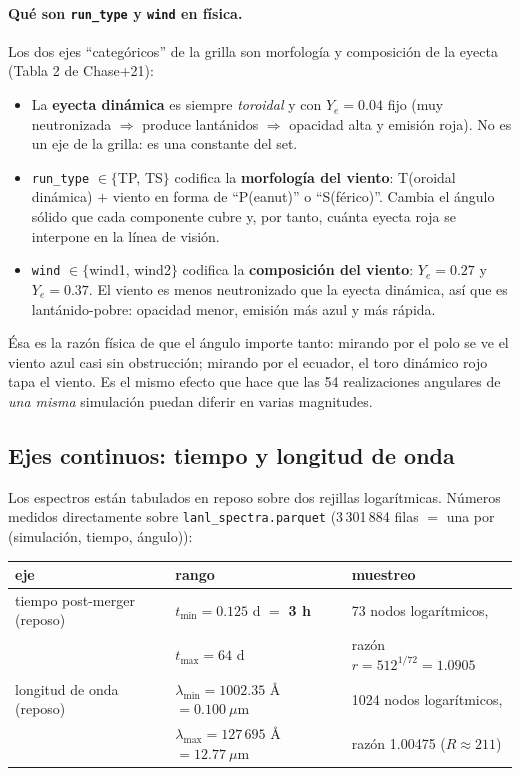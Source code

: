 \documentclass[11pt,a4paper]{article}
\newcommand{\code}[1]{\texttt{\small #1}}
\begin{document}
\paragraph{Qué son \code{run\_type} y \code{wind} en física.} Los dos ejes ``categóricos'' de la
grilla son morfología y composición de la eyecta (Tabla 2 de Chase+21):
\begin{itemize}[nosep]
  \item La \textbf{eyecta dinámica} es siempre \emph{toroidal} y con $Y_e = 0.04$ fijo (muy
        neutronizada $\Rightarrow$ produce lantánidos $\Rightarrow$ opacidad alta y emisión roja).
        No es un eje de la grilla: es una constante del set.
  \item \code{run\_type} $\in\{$TP, TS$\}$ codifica la \textbf{morfología del viento}: T(oroidal
        dinámica) $+$ viento en forma de ``P(eanut)'' o ``S(férico)''. Cambia el ángulo sólido que
        cada componente cubre y, por tanto, cuánta eyecta roja se interpone en la línea de visión.
  \item \code{wind} $\in\{$wind1, wind2$\}$ codifica la \textbf{composición del viento}:
        $Y_e = 0.27$ y $Y_e = 0.37$. El viento es menos neutronizado que la eyecta dinámica, así que
        es lantánido-pobre: opacidad menor, emisión más azul y más rápida.
\end{itemize}
Ésa es la razón física de que el ángulo importe tanto: mirando por el polo se ve el viento azul casi
sin obstrucción; mirando por el ecuador, el toro dinámico rojo tapa el viento. Es el mismo efecto
que hace que las 54 realizaciones angulares de \emph{una misma} simulación puedan diferir en varias
magnitudes.

\subsection{Ejes continuos: tiempo y longitud de onda}
\label{sec:lanl-ejes}

Los espectros están tabulados en reposo sobre dos rejillas logarítmicas. Números medidos
directamente sobre \code{lanl\_spectra.parquet} (3\,301\,884 filas $=$ una por
(simulación, tiempo, ángulo)):

\begin{center}
\begin{tabular}{lll}
\toprule
eje & rango & muestreo \\
\midrule
tiempo post-merger (reposo)
  & $t_{\min} = 0.125$ d $=$ \textbf{3 h}
  & 73 nodos logarítmicos, \\
  & $t_{\max} = 64$ d
  & razón $r = 512^{1/72} = 1.0905$ \\[4pt]
longitud de onda (reposo)
  & $\lambda_{\min} = 1002.35$ Å $= 0.100\ \mu$m
  & 1024 nodos logarítmicos, \\
  & $\lambda_{\max} = 127\,695$ Å $= 12.77\ \mu$m
  & razón 1.00475 ($R \approx 211$) \\
\bottomrule
\end{tabular}
\end{center}
\end{document}
